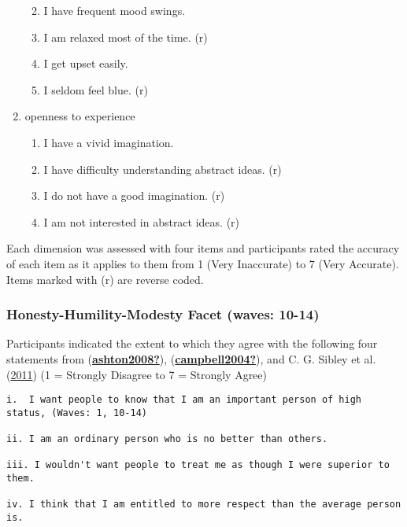 \documentclass[
  singlecolumn]{report}
\begin{document}
\begin{enumerate}
  \begin{enumerate}
  \def\labelenumii{\roman{enumii}.}
  \item
    I have frequent mood swings.
  \item
    I am relaxed most of the time. (r)
  \item
    I get upset easily.
  \item
    I seldom feel blue. (r)
  \end{enumerate}
\item
  openness to experience

  \begin{enumerate}
  \def\labelenumii{\roman{enumii}.}
  \item
    I have a vivid imagination.
  \item
    I have difficulty understanding abstract ideas. (r)
  \item
    I do not have a good imagination. (r)
  \item
    I am not interested in abstract ideas. (r)
  \end{enumerate}
\end{enumerate}

Each dimension was assessed with four items and participants rated the
accuracy of each item as it applies to them from 1 (Very Inaccurate) to
7 (Very Accurate). Items marked with (r) are reverse coded.

\hypertarget{honesty-humility-modesty-facet-waves-10-14}{%
\subsubsection{Honesty-Humility-Modesty Facet (waves:
10-14)}\label{honesty-humility-modesty-facet-waves-10-14}}

Participants indicated the extent to which they agree with the following
four statements from
(\protect\hyperlink{ref-ashton2008}{\textbf{ashton2008?}}),
(\protect\hyperlink{ref-campbell2004}{\textbf{campbell2004?}}), and C.
G. Sibley et al. (\protect\hyperlink{ref-sibley2011}{2011}) (1 =
Strongly Disagree to 7 = Strongly Agree)

\begin{verbatim}
i.  I want people to know that I am an important person of high status, (Waves: 1, 10-14)

ii. I am an ordinary person who is no better than others.

iii. I wouldn't want people to treat me as though I were superior to them.

iv. I think that I am entitled to more respect than the average person is.
\end{verbatim}
\end{document}
